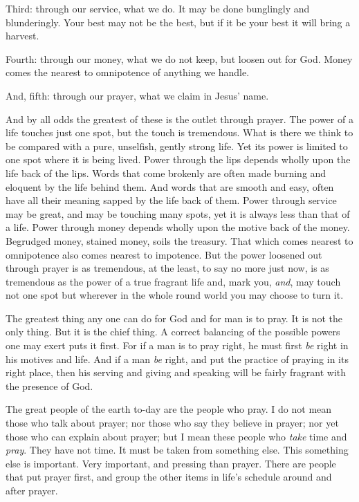 Third: through our service, what we do. It may be done bunglingly and
blunderingly. Your best may not be the best, but if it be your best it
will bring a harvest.

Fourth: through our money, what we do not keep, but loosen out for God.
Money comes the nearest to omnipotence of anything we handle.

And, fifth: through our prayer, what we claim in Jesus' name.

And by all odds the greatest of these is the outlet through prayer. The
power of a life touches just one spot, but the touch is tremendous. What
is there we think to be compared with a pure, unselfish, gently strong
life. Yet its power is limited to one spot where it is being lived. Power
through the lips depends wholly upon the life back of the lips. Words that
come brokenly are often made burning and eloquent by the life behind them.
And words that are smooth and easy, often have all their meaning sapped by
the life back of them. Power through service may be great, and may be
touching many spots, yet it is always less than that of a life. Power
through money depends wholly upon the motive back of the money. Begrudged
money, stained money, soils the treasury. That which comes nearest to
omnipotence also comes nearest to impotence. But the power loosened out
through prayer is as tremendous, at the least, to say no more just now, is
as tremendous as the power of a true fragrant life and, mark you, \textit{and},
may touch not one spot but wherever in the whole round world you may
choose to turn it.

The greatest thing any one can do for God and for man is to pray. It is
not the only thing. But it is the chief thing. A correct balancing of the
possible powers one may exert puts it first. For if a man is to pray
right, he must first \textit{be} right in his motives and life. And if a man \textit{be}
right, and put the practice of praying in its right place, then his
serving and giving and speaking will be fairly fragrant with the presence
of God.

The great people of the earth to-day are the people who pray. I do not
mean those who talk about prayer; nor those who say they believe in
prayer; nor yet those who can explain about prayer; but I mean these
people who \textit{take} time and \textit{pray}. They have not time. It must be taken
from something else. This something else is important. Very important, and
pressing than prayer. There are people that put prayer first, and group
the other items in life's schedule around and after prayer.

